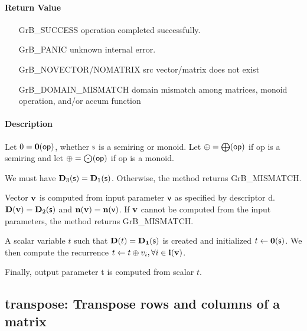 \paragraph{Return Value}

\begin{itemize}[leftmargin=2.1in]
\item[{\sf GrB\_SUCCESS}]             operation completed successfully.
\item[{\sf GrB\_PANIC}]               unknown internal error.
\item[{\sf GrB\_NOVECTOR/NOMATRIX}]   {\sf src} vector/matrix does not exist
\item[{\sf GrB\_DOMAIN\_MISMATCH}]  
        domain mismatch among matrices, monoid operation, and/or
        accum function 
\end{itemize}

\paragraph{Description}

Let $0 = \bold{0}({\sf op})$, whether ${\sf s}$ is a semiring or monoid.
Let $\oplus = \bigoplus({\sf op})$ if op is a semiring and let 
$\oplus = \bigodot({\sf op})$ if op is a monoid.

We must have $\bold{D}_3({\sf s}) = \bold{D}_1({\sf s})$.
Otherwise, the method returns {\sf GrB\_MISMATCH}.

Vector ${\bf v}$ is computed from input parameter ${\sf v}$ as
specified by descriptor {\sf d}. $\bold{D}({\bf v}) = \bold{D}_2({\sf s})$
and $\bold{n}({\bf v}) = \bold{n}({\sf v})$. If ${\bf v}$ cannot be computed
from the input parameters, the method returns {\sf GrB\_MISMATCH}.

A scalar variable $t$ such that $\bold{D}(t) = \bold{D_1}({\sf s})$ is
created and initialized $t \leftarrow \bold{0}({\sf s})$. 
We then compute the recurrence $t \leftarrow t \oplus v_i, \forall i \in {\bf i}({\bf v})$.

Finally, output parameter {\sf t} is computed from scalar $t$.


\subsection{{\sf transpose}: Transpose rows and columns of a matrix}

